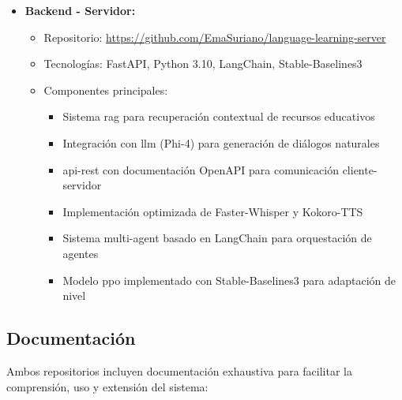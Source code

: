 \begin{itemize}
    \item \textbf{Backend - Servidor:}
    \begin{itemize}
        \item Repositorio: \url{https://github.com/EmaSuriano/language-learning-server}
        \item Tecnologías: FastAPI, Python 3.10, LangChain, Stable-Baselines3
        \item Componentes principales:
              \begin{itemize}
                  \item Sistema \gls{rag} para recuperación contextual de recursos educativos
                  \item Integración con \gls{llm} (Phi-4) para generación de diálogos naturales
                  \item \gls{api-rest} con documentación OpenAPI para comunicación cliente-servidor
                  \item Implementación optimizada de Faster-Whisper y Kokoro-TTS
                  \item Sistema \gls{multi-agent} basado en LangChain para orquestación de agentes
                  \item Modelo \gls{ppo} implementado con Stable-Baselines3 para adaptación de nivel
              \end{itemize}
    \end{itemize}
\end{itemize}

\subsection{Documentación}
\label{subsec:documentacion-repositorios}

Ambos repositorios incluyen documentación exhaustiva para facilitar la comprensión, uso y extensión del sistema:


